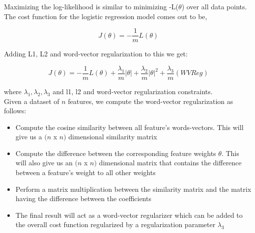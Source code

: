 Maximizing the log-likelihood is similar to minimizing -L($\theta$) over all data points. The cost function for the logistic regression model comes out to be,

\begin{equation}
\ J(\theta) = -\frac{1}{m}{L(\theta)}
\end{equation}

Adding L1, L2 and word-vector regularization to this we get:

\begin{equation}
\ J(\theta) = -\frac{1}{m}{L(\theta)} + \frac{\lambda_{1}}{m}{|{\theta}|} + \frac{\lambda_{2}}{m}{|{\theta}|}^{2} + 
\frac{\lambda_{3}}{m}{(WV Reg)}
\end{equation}

where $\lambda_{1}, \lambda_{2}, \lambda_{3}$ and l1, l2 and word-vector regularization constraints.\\

\noindent Given a dataset of $n$ features, we compute the word-vector regularization as follows:

\begin{itemize}
\item Compute the cosine similarity between all feature's words-vectors. This will give us a $(n$ x $n)$ dimensional similarity matrix
\item Compute the difference between the corresponding feature weights $\theta$. This will also give us an $(n$ x $n)$ dimensional matrix that contains the difference between a feature's weight to all other weights
\item Perform a matrix multiplication between the similarity matrix and the matrix having the difference between the coefficients
\item The final result will act as a word-vector regularizer which can be added to the overall cost function regularized by a regularization parameter $\lambda_{3}$

\end{itemize}

